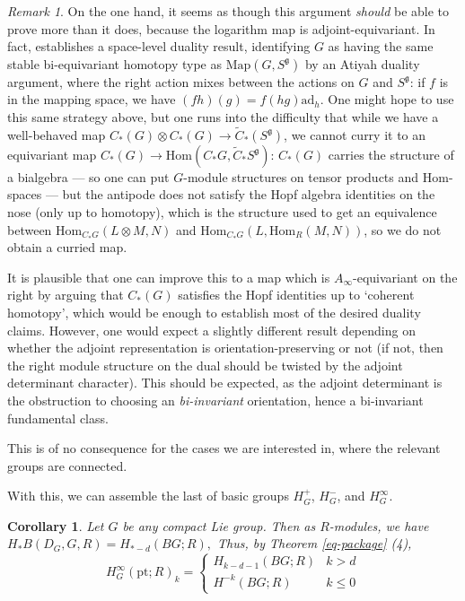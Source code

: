 \documentclass{memo-l}
\newtheorem{corollary}[theorem]{Corollary}
\theoremstyle{definition}
\theoremstyle{remark}
\newtheorem{remark}[theorem]{Remark}
\numberwithin{section}{chapter}
\numberwithin{equation}{chapter}
\begin{document}
\begin{remark}
On the one hand, it seems as though this argument \emph{should} be able to prove more than it does, because the logarithm map is adjoint-equivariant. In fact, \cite[Theorem 10.1]{Klein} establishes a space-level duality result, identifying $G$ as having the same stable bi-equivariant homotopy type as $\text{Map}(G, S^{\mathfrak g})$ by an Atiyah duality argument, where the right action mixes between the actions on $G$ and $S^{\mathfrak g}$: if $f$ is in the mapping space, we have $(fh)(g) = f(hg) \text{ad}_h$. One might hope to use this same strategy above, but one runs into the difficulty that while we have a well-behaved map $C_*(G) \otimes C_*(G) \to \tilde C_*(S^{\mathfrak g})$, we cannot curry it to an equivariant map $C_*(G) \to \text{Hom}(C_* G, \tilde C_* S^{\mathfrak g})$: $C_*(G)$ carries the structure of a bialgebra --- so one can put $G$-module structures on tensor products and Hom-spaces --- but the antipode does not satisfy the Hopf algebra identities on the nose (only up to homotopy), which is the structure used to get an equivalence between $\text{Hom}_{C_* G}(L \otimes M, N)$ and $\text{Hom}_{C_* G}(L, \text{Hom}_R(M, N))$, so we do not obtain a curried map. 

It is plausible that one can improve this to a map which is $A_\infty$-equivariant on the right by arguing that $C_*(G)$ satisfies the Hopf identities up to `coherent homotopy', which would be enough to establish most of the desired duality claims. However, one would expect a slightly different result depending on whether the adjoint representation is orientation-preserving or not (if not, then the right module structure on the dual should be twisted by the adjoint determinant character). This should be expected, as the adjoint determinant is the obstruction to choosing an \emph{bi-invariant} orientation, hence a bi-invariant fundamental class. 

This is of no consequence for the cases we are interested in, where the relevant groups are connected.
\end{remark}

With this, we can assemble the last of basic groups $H_G^+$, $H_G^-$, and $H_G^\infty$.

\begin{corollary}\label{cor:calc} Let $G$ be any compact Lie group. Then as $R$-modules, we have $H_* B(D_G, G, R) = H_{*-d}(BG;R),$ Thus, by Theorem \ref{eq-package} (4), $$H_{G}^\infty(\text{pt};R)_k = \begin{cases} H_{k-d-1}(BG; R) & k > d \\
H^{-k}(BG;R) & k \leq 0\end{cases}$$
\end{corollary}
\end{document}
